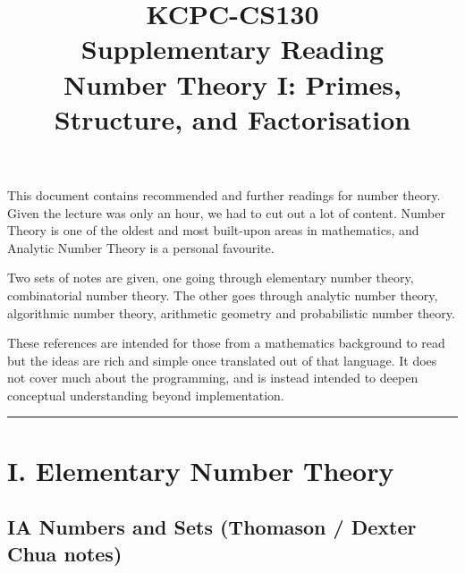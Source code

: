 \documentclass[11pt]{article}
\title{KCPC-CS130 \\ Supplementary Reading \\ Number Theory I: Primes, Structure, and Factorisation}
\author{}
\date{}
\begin{document}
\maketitle

\noindent
This document contains recommended and further readings for number theory. Given the lecture was only an hour, we had to cut out a lot of content. Number Theory is one of the oldest and most built-upon areas in mathematics, and Analytic Number Theory is a personal favourite. 

Two sets of notes are given, one going through elementary number theory, combinatorial number theory. The other goes through analytic number theory, algorithmic number theory, arithmetic geometry and probabilistic number theory.

These references are intended for those from a mathematics background to read but the ideas are rich and simple once translated out of that language. It does not cover much about the programming, and is instead intended to deepen conceptual understanding beyond implementation.
\vspace{1em}
\hrule
\vspace{1em}

\section*{I. Elementary Number Theory}
\subsection*{IA Numbers and Sets (Thomason / Dexter Chua notes)}
\end{document}

